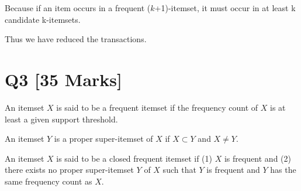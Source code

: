 \documentclass[en,black,normal,10pt]{elegantnote}
\begin{document}
Because if an item occurs in a frequent ($k$+1)-itemset,
it must occur in at least k candidate k-itemsets.


Thus we have reduced the transactions.

\section*{Q3 [35 Marks]}

An itemset $X$ is said to be a frequent itemset if the frequency count of $X$ is at least a given support threshold.

An itemset $Y$ is a proper super-itemset of $X$ if $X \subset Y$ and $X \neq Y$. 

An itemset $X$ is said to be a closed frequent itemset 
if (1) $X$ is frequent 
and (2) there exists no proper super-itemset $Y$ of $X$ such that $Y$ is frequent 
and $Y$ has the same frequency count as $X$.
\end{document}
